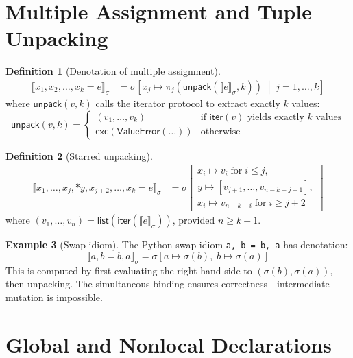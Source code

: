 \documentclass[11pt,a4paper]{report}
\theoremstyle{definition}
\newtheorem{definition}{Definition}[chapter]
\newtheorem{example}[definition]{Example}
\theoremstyle{plain}
\newcommand{\den}[1]{\llbracket #1 \rrbracket}
\begin{document}
\section{Multiple Assignment and Tuple Unpacking}

\begin{definition}[Denotation of multiple assignment]
\begin{align}
  \den{x_1, x_2, \ldots, x_k = e}_\sigma
    &= \sigma\!\left[x_j \mapsto \pi_j(\mathsf{unpack}(\den{e}_\sigma, k))
       \;\middle|\; j = 1, \ldots, k\right]
\end{align}
where $\mathsf{unpack}(v, k)$ calls the iterator protocol to extract exactly
$k$ values:
\[
  \mathsf{unpack}(v, k) =
  \begin{cases}
    (v_1, \ldots, v_k) & \text{if $\mathsf{iter}(v)$ yields exactly $k$ values} \\
    \mathsf{exc}(\mathsf{ValueError}(\ldots)) & \text{otherwise}
  \end{cases}
\]
\end{definition}

\begin{definition}[Starred unpacking]
\begin{align}
  \den{x_1, \ldots, x_j, *y, x_{j+2}, \ldots, x_k = e}_\sigma
    &= \sigma\!\left[
      \begin{array}{l}
        x_i \mapsto v_i \;\text{for}\; i \leq j, \\
        y \mapsto [v_{j+1}, \ldots, v_{n-k+j+1}], \\
        x_i \mapsto v_{n-k+i} \;\text{for}\; i \geq j+2
      \end{array}
    \right]
\end{align}
where $(v_1, \ldots, v_n) = \mathsf{list}(\mathsf{iter}(\den{e}_\sigma))$,
provided $n \geq k - 1$.
\end{definition}

\begin{example}[Swap idiom]
The Python swap idiom \lstinline[style=python]{a, b = b, a} has denotation:
\[
  \den{a, b = b, a}_\sigma = \sigma[a \mapsto \sigma(b),\; b \mapsto \sigma(a)]
\]
This is computed by first evaluating the right-hand side to
$(\sigma(b), \sigma(a))$, then unpacking.  The simultaneous binding ensures
correctness---intermediate mutation is impossible.
\end{example}


\section{Global and Nonlocal Declarations}
\end{document}
